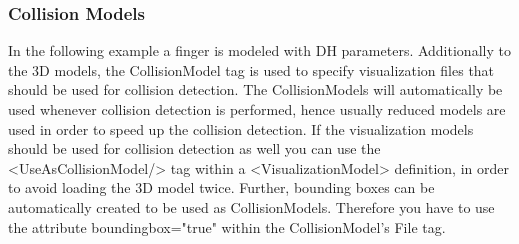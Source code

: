 \subsubsection{Collision Models}
\par
In the following example a finger is modeled with DH parameters. Additionally to the 3D models, the CollisionModel tag is used to specify visualization files that should be used for collision detection. The CollisionModels will automatically be used whenever collision detection is performed, hence usually reduced models are used in order to speed up the collision detection. If the visualization models should be used for collision detection as well you can use the <UseAsCollisionModel/> tag within a <VisualizationModel> definition, in order to avoid loading the 3D model twice. Further, bounding boxes can be automatically created to be used as CollisionModels. Therefore you have to use the attribute boundingbox="true" within the CollisionModel's File tag. 
\par
